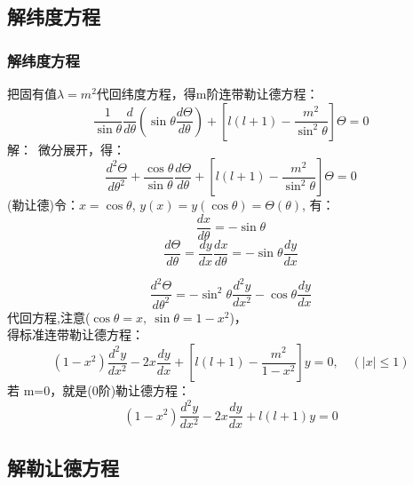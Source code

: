 \subsection{解纬度方程}
\begin{frame}
	\frametitle{解纬度方程}
	把固有值$\lambda=m^2$代回纬度方程，得m阶连带勒让德方程：
	\begin{equation*}
		\boxed{\frac{1}{\sin \theta} \frac{d}{d \theta}\left(\sin \theta \frac{d \Theta}{d \theta}\right)+\left[l(l+1)-\frac{m^{2}}{\sin ^{2} \theta}\right] \Theta=0}
	\end{equation*}	
	\alert{解：}~微分展开，得：
	\begin{equation*}
		\frac{d^{2} \Theta}{d \theta^{2}}+\frac{\cos \theta}{\sin \theta} \frac{d \Theta}{d \theta}+\left[l(l+1)-\frac{m^{2}}{\sin ^{2} \theta}\right] \Theta=0
	\end{equation*}		
	(勒让德)令：$x=\cos \theta$,  $y(x)= y(\cos \theta) =\Theta (\theta)$, 有：
	\begin{equation*}
		\frac{d x}{d  \theta} =-\sin \theta  
	\end{equation*}		
	\begin{equation*}
		\frac{d \Theta}{d \theta} =\frac{d y}{d x}\frac{d x}{d \theta} =-\sin \theta \frac{d y}{d x}
	\end{equation*}		
\end{frame}	

\begin{frame}
	\begin{equation*}
		\frac{ d^2 \Theta }{d \theta ^2} =-\sin ^2 \theta \frac{d^2 y}{d x^2} -\cos \theta \frac{d y}{d x}
	\end{equation*}		
	代回方程,注意($\cos\theta =x,~ \sin  \theta =1-x^2 $)， \\
	得标准连带勒让德方程：
	\begin{equation*}
		\left(1-x^{2}\right) \frac{d^{2} y}{d x^{2}}-2 x \frac{d y}{d x}+\left[l(l+1)-\frac{m^{2}}{1-x^{2}}\right] y=0, \quad (|x|\le 1)
	\end{equation*}		
	若 m=0，就是(0阶)勒让德方程：
	\begin{equation*}
		\left(1-x^{2}\right) \frac{d^{2} y}{d x^{2}}-2 x \frac{d y}{d x}+l(l+1)y=0
	\end{equation*}		
\end{frame}	

\subsection{解勒让德方程}

